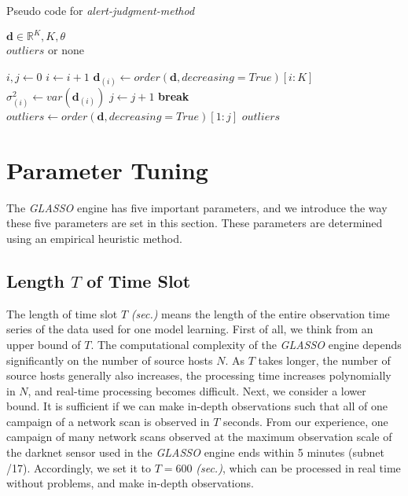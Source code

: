\documentclass[conference]{IEEEtran}
\begin{document}
\begin{algorithm}[tb]
\caption{Pseudo code for \textit{alert-judgment-method}}
\label{alg2}
\begin{algorithmic}[1]
  \REQUIRE $\bm{d}\in\mathbb{R}^{K}, K, \theta$\\
  \ENSURE $outliers$ or none

  \STATE $i, j \gets 0$
    \STATE $i \gets i + 1$
    \STATE $\bm{d}_{(i)} \gets order(\bm{d}, decreasing=True)[i:K]$
    \STATE $\sigma_{(i)}^2 \gets var(\bm{d}_{(i)})$
      \STATE $j \gets j + 1$
      \STATE \textbf{break}
    \ELSE
      \STATE $outliers \gets order(\bm{d}, decreasing=True)[1:j]$
      \RETURN $outliers$
    \ENDIF
  \ENDWHILE
\end{algorithmic}
\end{algorithm}



\section{Parameter Tuning}
\label{Parameter}
The \textit{GLASSO} engine has five important parameters, and we introduce the way these five parameters are set in this section.
These parameters are determined using an empirical heuristic method.


\subsection{Length $T$ of Time Slot}
The length of time slot $T$ \textit{(sec.)} means the length of the entire observation time series of the data used for one model learning.
First of all, we think from an upper bound of $T$.
The computational complexity of the \textit{GLASSO} engine depends significantly on the number of source hosts $N$.
As $T$ takes longer, the number of source hosts generally also increases, the processing time increases polynomially in $N$, and real-time processing becomes difficult.
Next, we consider a lower bound.
It is sufficient if we can make in-depth observations such that all of one campaign of a network scan is observed in $T$ seconds.
From our experience, one campaign of many network scans observed at the maximum observation scale of the darknet sensor used in the \textit{GLASSO} engine ends within 5 minutes (subnet /17).
Accordingly, we set it to $T=600$ \textit{(sec.)}, which can be processed in real time without problems, and make in-depth observations.
\end{document}
